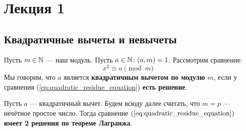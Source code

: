 \section{Лекция 1}
\subsection{Квадратичные вычеты и невычеты}
Пусть $m \in \mathbb{N}$ --- наш модуль. Пусть $a \in \mathbb{N} \colon (a, m) = 1$. Рассмотрим сравнение:
\begin{equation}
  \label{eq:quadratic_residue_equation}
x^{2} \equiv a \pmod m
\end{equation}
Мы говорим, что $a$ является \textbf{квадратичным вычетом по модулю $m$}, если у сравнения (\ref{eq:quadratic_residue_equation}) \textbf{есть решение}.

Пусть $a$ --- квадратичный вычет. Будем всюду далее считать, что $m = p$ --- нечётное простое число. Тогда сравнение $(\ref{eq:quadratic_residue_equation})$ \textbf{имеет 2 решения по теореме Лагранжа}.

